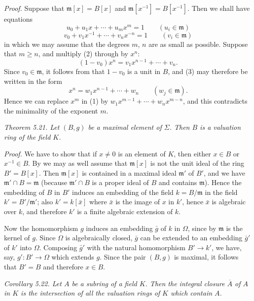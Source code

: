 \noindent\textit{Proof.} Suppose that $\mathfrak m[x]=B[x]$ and $\mathfrak m[x^{-1}]=B[x^{-1}]$. Then we shall have equations
\begin{equation}
 u_0+u_1x+\cdots+u_mx^m=1\qquad(u_i\in\mathfrak m)
 \tag{1}
\end{equation}
\begin{equation}
 v_0+v_1x^{-1}+\cdots+v_nx^{-n}=1\qquad(v_i\in\mathfrak m)
 \tag{2}
\end{equation}
in which we may assume that the degrees $m$, $n$ are as small as possible. Suppose that $m\geq n$, and multiply (2) through by $x^n$:
\begin{equation}
 (1-v_0)x^n=v_1x^{n-1}+\cdots+v_n.
 \tag{3}
\end{equation}
Since $v_0\in\mathfrak m$, it follows from  that $1-v_0$ is a unit in $B$, and (3) may therefore be written in the form
\[
 x^n=w_1x^{n-1}+\cdots+w_n\qquad(w_j\in\mathfrak m).
\]
Hence we can replace $x^m$ in (1) by $w_1x^{m-1}+\cdots+w_nx^{m-n}$, and this contradicts the minimality of the exponent $m$. \proofbox

\noindent\textit{Theorem 5.21. Let $(B,g)$ be a maximal element of $\Sigma$. Then $B$ is a valuation ring of the field $K$.}

\noindent\textit{Proof.} We have to show that if $x\neq0$ is an element of $K$, then either $x\in B$ or $x^{-1}\in B$. By  we may as well assume that $\mathfrak m[x]$ is not the unit ideal of the ring $B'=B[x]$. Then $\mathfrak m[x]$ is contained in a maximal ideal $\mathfrak m'$ of $B'$, and we have $\mathfrak m'\cap B=\mathfrak m$ (because $\mathfrak m'\cap B$ is a proper ideal of $B$ and contains $\mathfrak m$). Hence the embedding of $B$ in $B'$ induces an embedding of the field $k=B/\mathfrak m$ in the field $k'=B'/\mathfrak m'$; also $k'=k[\bar x]$ where $\bar x$ is the image of $x$ in $k'$, hence $\bar x$ is algebraic over $k$, and therefore $k'$ is a finite algebraic extension of $k$.

Now the homomorphism $g$ induces an embedding $\bar g$ of $k$ in $\Omega$, since by  $\mathfrak m$ is the kernel of $g$. Since $\Omega$ is algebraically closed, $\bar g$ can be extended to an embedding $\bar g'$ of $k'$ into $\Omega$. Composing $\bar g'$ with the natural homomorphism $B'\longrightarrow k'$, we have, say, $g':B'\longrightarrow\Omega$ which extends $g$. Since the pair $(B,g)$ is maximal, it follows that $B'=B$ and therefore $x\in B$. \proofbox

\noindent\textit{Corollary 5.22. Let $A$ be a subring of a field $K$. Then the integral closure $\overline A$ of $A$ in $K$ is the intersection of all the valuation rings of $K$ which contain $A$.}

